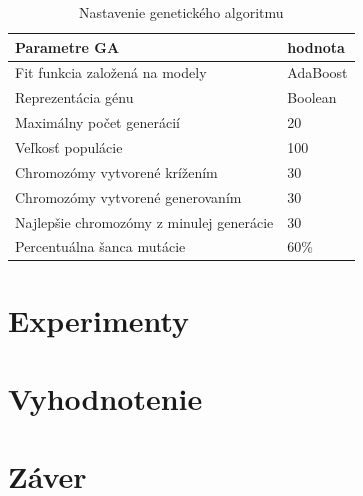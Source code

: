 \documentclass[runningheads]{llncs}
\begin{document}
\begin{table}[]
\centering
\caption{Nastavenie genetického algoritmu}\label{tab_nastavenie_gen_alg}
\begin{tabular}{|l|l|}
\hline
\textbf{Parametre GA}                    & \textbf{hodnota}  \\ \hline
Fit funkcia založená na modely           & AdaBoost \\ \hline
Reprezentácia génu                       & Boolean  \\ \hline
Maximálny počet generácií                & 20       \\ \hline
Veľkosť populácie                        & 100      \\ \hline
Chromozómy vytvorené krížením            & 30       \\ \hline
Chromozómy vytvorené generovaním         & 30       \\ \hline
Najlepšie chromozómy z minulej generácie & 30       \\ \hline
Percentuálna šanca mutácie               & 60\%     \\ \hline
\end{tabular}
\end{table}




\section{Experimenty}

\section{Vyhodnotenie}

\section{Záver}
\end{document}
